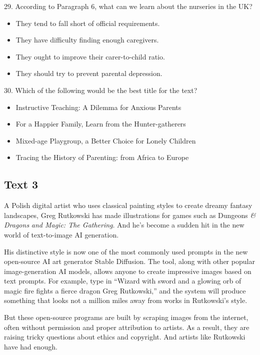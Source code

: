 \documentclass[UTF8,11pt]{ctexart}
\begin{document}
29. According to Paragraph 6, what can we learn about the nurseries in the UK?


\begin{itemize}[leftmargin=2em,itemsep=.2em,topsep=.4em]\item[A.] They tend to fall short of official requirements.
\item[B.] They have difficulty finding enough caregivers.
\item[C.] They ought to improve their carer-to-child ratio.
\item[D.] They should try to prevent parental depression.
\end{itemize}

30. Which of the following would be the best title for the text?


\begin{itemize}[leftmargin=2em,itemsep=.2em,topsep=.4em]\item[A.] Instructive Teaching: A Dilemma for Anxious Parents
\item[B.] For a Happier Family, Learn from the Hunter-gatherers
\item[C.] Mixed-age Playgroup, a Better Choice for Lonely Children
\item[D.] Tracing the History of Parenting: from Africa to Europe
\end{itemize}

\subsection*{\textbf{Text 3}}


A Polish digital artist who uses classical painting styles to create dreamy fantasy landscapes, Greg Rutkowski has made illustrations for games such as Dungeons \textit{\& Dragons} \textit{and Magic: The Gathering}. And he’s become a sudden hit in the new world of text-to-image AI generation.


His distinctive style is now one of the most commonly used prompts in the new open-source AI art generator Stable Diffusion. The tool, along with other popular image-generation AI models, allows anyone to create impressive images based on text prompts. For example, type in “Wizard with sword and a glowing orb of magic fire fights a fierce dragon Greg Rutkowski,” and the system will produce something that looks not a million miles away from works in Rutkowski’s style.


But these open-source programs are built by scraping images from the internet, often without permission and proper attribution to artists. As a result, they are raising tricky questions about ethics and copyright. And artists like Rutkowski have had enough.
\end{document}
